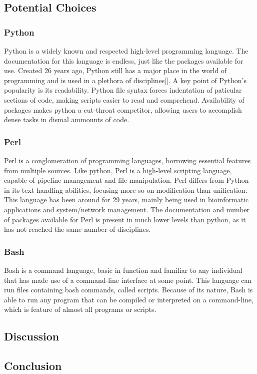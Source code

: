 \documentclass[onecolumn, draftclsnofoot,10pt, compsoc]{IEEEtran}
\begin{document}
	\subsection{Potential Choices}
		\subsubsection{Python}
		Python is a widely known and respected high-level programming language.
		The documentation for this language is endless, just like the packages available for use.
		Created 26 years ago, Python still has a major place in the world of programming and is used in a plethora of disciplines[].
		A key point of Python's popularity is its readability.
		Python file syntax forces indentation of paticular sections of code, making scripts easier to read and comprehend.
		Availability of packages makes python a cut-throat competitor, allowing users to accomplish dense tasks in dismal ammounts of code.
		\subsubsection{Perl}
		Perl is a conglomeration of programming languages, borrowing essential features from multiple sources.
		Like python, Perl is a high-level scripting language, capable of pipeline management and file manipulation.
		Perl differs from Python in its text handling abilities, focusing more so on modification than unification.
		This language has been around for 29 years, mainly being used in bioinformatic applications and system/network management.
		The documentation and number of packages available for Perl is present in much lower levels than python, as it has not reached the same number of disciplines.
		\subsubsection{Bash}
		Bash is a command language, basic in function and familiar to any individual that has made use of a command-line interface at some point.
		This language can run files containing bash commands, called scripts. 
		Because of its nature, Bash is able to run any program that can be compiled or interpreted on a command-line, which is feature of almost all programs or scripts. 
	\subsection{Discussion}
	
	\subsection{Conclusion}
\end{document}
